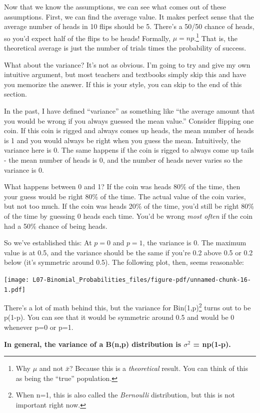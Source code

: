 \documentclass[
  letterpaper,
  DIV=11,
  numbers=noendperiod,
  oneside]{scrreprt}
\begin{document}
Now that we know the assumptions, we can see what comes out of these
assumptions. First, we can find the average value. It makes perfect
sense that the average number of heads in 10 flips should be 5. There's
a 50/50 chance of heads, so you'd expect half of the flips to be heads!
Formally, \(\mu = np\).\footnote{Why \(\mu\) and not \(\bar x\)? Because
  this is a \emph{theoretical} result. You can think of this as being
  the ``true'' population.} That is, the theoretical average is just the
number of trials times the probability of success.

What about the variance? It's not as obvious. I'm going to try and give
my own intuitive argument, but most teachers and textbooks simply skip
this and have you memorize the answer. If this is your style, you can
skip to the end of this section.

In the past, I have defined ``variance'' as something like ``the average
amount that you would be wrong if you always guessed the mean value.''
Consider flipping one coin. If this coin is rigged and always comes up
heads, the mean number of heads is 1 and you would always be right when
you guess the mean. Intuitively, the variance here is 0. The same
happens if the coin is rigged to always come up tails - the mean number
of heads is 0, and the number of heads never varies so the variance is
0.

What happens between 0 and 1? If the coin was heads 80\% of the time,
then your guess would be right 80\% of the time. The actual value of the
coin varies, but not too much. If the coin was heads 20\% of the time,
you'd still be right 80\% of the time by guessing 0 heads each time.
You'd be wrong \emph{most often} if the coin had a 50\% chance of being
heads.

So we've established this: At \(p=0\) and \(p=1\), the variance is 0.
The maximum value is at 0.5, and the variance should be the same if
you're 0.2 above 0.5 or 0.2 below (it's symmetric around 0.5). The
following plot, then, seems reasonable:

\texttt{[image: L07-Binomial\_Probabilities\_files/figure-pdf/unnamed-chunk-16-1.pdf]}

There's a lot of math behind this, but the variance for
Bin(1,p)\footnote{When n=1, this is also called the \emph{Bernoulli}
  distribution, but this is not important right now.} turns out to be
p(1-p). You can see that it would be symmetric around 0.5 and would be 0
whenever p=0 or p=1.

\textbf{In general, the variance of a B(n,p) distribution is
\(\sigma^2\) = np(1-p).}
\end{document}
